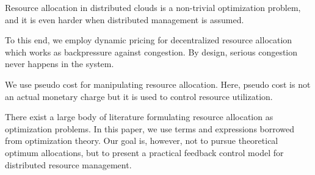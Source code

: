 Resource allocation in distributed clouds is a non-trivial
optimization problem, and it is even harder when distributed
management is assumed.

To this end, we employ dynamic pricing for decentralized resource
allocation which works as backpressure against congestion.
By design, serious congestion never happens in the system.

We use pseudo cost for manipulating resource allocation.
Here, pseudo cost is not an actual monetary charge but it is used to
control resource utilization.

There exist a large body of literature formulating resource allocation
as optimization problems.
In this paper, we use terms and expressions borrowed from optimization
theory. Our goal is, however, not to pursue theoretical optimum
allocations, but to present a practical feedback control model for
distributed resource management.


